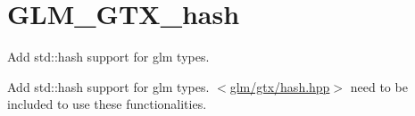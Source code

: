 \hypertarget{group__gtx__hash}{\section{G\-L\-M\-\_\-\-G\-T\-X\-\_\-hash}
\label{group__gtx__hash}
}


Add std\-::hash support for glm types.  


Add std\-::hash support for glm types. $<$\hyperlink{hash_8hpp}{glm/gtx/hash.\-hpp}$>$ need to be included to use these functionalities. 